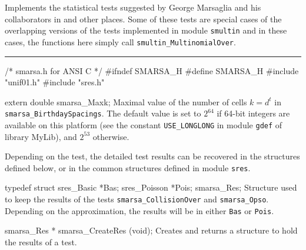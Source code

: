 
Implements the statistical tests suggested by George Marsaglia and his
collaborators in \cite{rMAR85a} and other places.
Some of these tests are special cases of the overlapping versions of the
tests implemented in module {\tt smultin} and in these cases, the 
functions here simply call  {\tt smultin\_MultinomialOver}.
\resdef



\iffalse  %
For all these tests, when $N>1$, we may apply a two-level test 
over the  $N$ $p$-values obtained at the first level.
For $N=1$, we simply compute the $p$-value of the first level test;
$n$ is the sample size of the first level test.
We also drop the first $r$ bits (the most significant, 
$r \ge 0$) of each generated random number and apply the tests on
 the remaining bits.
\fi  %

\bigskip\hrule

\code\hide
/* smarsa.h for ANSI C */
#ifndef SMARSA_H
#define SMARSA_H
\endhide
#include "unif01.h"
#include "sres.h"
\endcode

\ifdetailed  %


\code

extern double smarsa_Maxk;
\endcode
\tab
   Maximal value of the number of cells $k = d^t$ in
   {\tt smarsa\_BirthdaySpacings}.
   The  default value is set to $2^{64}$ if 64-bit integers are available
   on this platform (see the constant {\tt USE\_LONGLONG} in module
   {\tt gdef} of library MyLib), and $2^{53}$ otherwise.
\endtab




Depending on the test, the detailed test results can be recovered in the
structures defined below, or in the common structures defined in module
 {\tt sres}.

\code

typedef struct {
   sres_Basic *Bas;
   sres_Poisson *Pois;
} smarsa_Res;
\endcode
 \tab
  Structure used to keep the results of the tests
  {\tt smarsa\_CollisionOver} and  {\tt smarsa\_Opso}.
  Depending on the approximation, the results will be in either {\tt Bas}
  or  {\tt Pois}.
 \endtab
\code


smarsa_Res * smarsa_CreateRes (void);
\endcode
 \tab 
  Creates and returns a structure to hold the results of a test. 
 \endtab
\code


